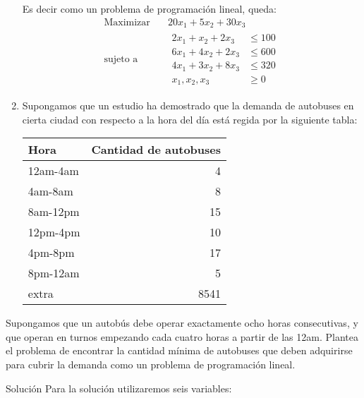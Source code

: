 \documentclass[twocolumn]{article}
\begin{document}
\begin{enumerate}
Es decir como un problema de programación lineal, queda:
\begin{equation*}
 \begin{aligned}
\text{Maximizar} \quad & 20x_1+5x_2+30x_3 \\
\text{sujeto a} \quad &
  \begin{aligned}
  2x_{1}+x_{2}+2x_{3}  &\leq 100\\
  6x_{1}+4x_{2}+2x_{3} &\leq 600\\
  4x_{1}+3x_{2}+8x_{3} &\leq 320\\
    x_{1},x_{2},x_{3} &\geq 0
  \end{aligned}
\end{aligned}
\end{equation*}



\item Supongamos que un estudio ha demostrado que la demanda de autobuses
en cierta ciudad con respecto a la hora del día está regida por la
siguiente tabla:
\begin{center}
\begin{tabular}{lr}
Hora & Cantidad de autobuses\\
\hline
12am-4am & 4\\
4am-8am & 8\\
8am-12pm & 15\\
12pm-4pm & 10\\
4pm-8pm & 17\\
8pm-12am & 5\\
extra & 8541\\
\end{tabular}
\end{center}
\end{enumerate}


Supongamos que un autobús debe operar exactamente ocho horas
consecutivas, y que operan en turnos empezando cada cuatro horas a
partir de las 12am. Plantea el problema de encontrar la cantidad
mínima de autobuses que deben adquirirse para cubrir la
demanda como un problema de programación lineal.
\item Solución
  Para la solución utilizaremos seis variables:
  
  
\end{document}
